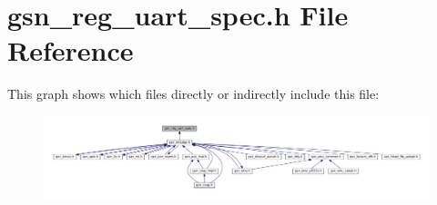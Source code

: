 \hypertarget{a00575}{
\section{gsn\_\-reg\_\-uart\_\-spec.h File Reference}
\label{a00575}
}
This graph shows which files directly or indirectly include this file:
\nopagebreak
\begin{figure}[H]
\begin{center}
\leavevmode
\includegraphics[width=400pt]{a00812}
\end{center}
\end{figure}
